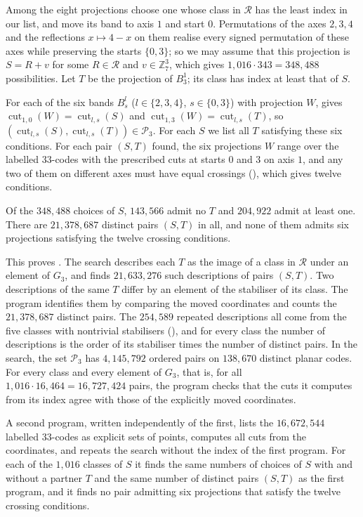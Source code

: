 \documentclass[11pt,colorlinks]{charlie}
\newcommand{\Zs}{\mathbb{Z}_7}
\newcommand{\cut}{\operatorname{cut}}
\newcommand{\cR}{\mathcal{R}}
\begin{document}
Among the eight projections choose one whose class in $\cR$ has the least index in our list, and move its band to axis $1$ and start $0$. Permutations of the axes $2,3,4$ and the reflections $x\mapsto4-x$ on them realise every signed permutation of these axes while preserving the starts $\{0,3\}$; so we may assume that this projection is $S=R+v$ for some $R\in\cR$ and $v\in\Zs^3$, which gives $1{,}016\cdot343=348{,}488$ possibilities. Let $T$ be the projection of $B^1_3$; its class has index at least that of $S$.

For each of the six bands $B^l_s$ ($l\in\{2,3,4\}$, $s\in\{0,3\}$) with projection $W$,  gives $\cut_{1,0}(W)=\cut_{l,s}(S)$ and $\cut_{1,3}(W)=\cut_{l,s}(T)$, so $(\cut_{l,s}(S),\cut_{l,s}(T))\in\mathcal P_3$. For each $S$ we list all $T$ satisfying these six conditions. For each pair $(S,T)$ found, the six projections $W$ range over the labelled $33$-codes with the prescribed cuts at starts $0$ and $3$ on axis $1$, and any two of them on different axes must have equal crossings (), which gives twelve conditions.

\begin{lemma}\label{lem:gapthree}
Of the $348{,}488$ choices of $S$, $143{,}566$ admit no $T$ and $204{,}922$ admit at least one. There are $21{,}378{,}687$ distinct pairs $(S,T)$ in all, and none of them admits six projections satisfying the twelve crossing conditions.
\end{lemma}

This proves . The search describes each $T$ as the image of a class in $\cR$ under an element of $G_3$, and finds $21{,}633{,}276$ such descriptions of pairs $(S,T)$. Two descriptions of the same $T$ differ by an element of the stabiliser of its class. The program identifies them by comparing the moved coordinates and counts the $21{,}378{,}687$ distinct pairs. The $254{,}589$ repeated descriptions all come from the five classes with nontrivial stabilisers (), and for every class the number of descriptions is the order of its stabiliser times the number of distinct pairs. In the search, the set $\mathcal P_3$ has $4{,}145{,}792$ ordered pairs on $138{,}670$ distinct planar codes. For every class and every element of $G_3$, that is, for all $1{,}016\cdot16{,}464=16{,}727{,}424$ pairs, the program checks that the cuts it computes from its index agree with those of the explicitly moved coordinates.

A second program, written independently of the first, lists the $16{,}672{,}544$ labelled $33$-codes as explicit sets of points, computes all cuts from the coordinates, and repeats the search without the index of the first program. For each of the $1{,}016$ classes of $S$ it finds the same numbers of choices of $S$ with and without a partner $T$ and the same number of distinct pairs $(S,T)$ as the first program, and it finds no pair admitting six projections that satisfy the twelve crossing conditions.
\end{document}
